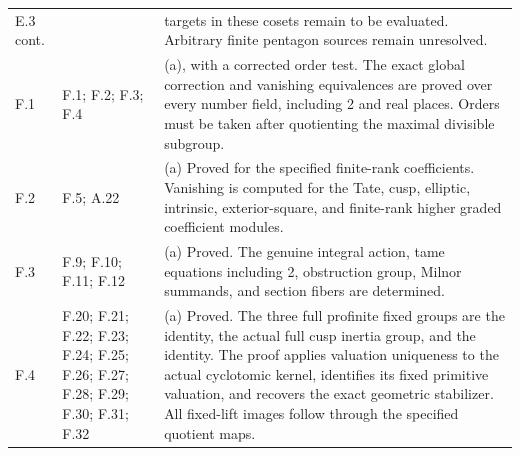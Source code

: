 \begin{longtable}{@{}p{1.1cm}p{3.0cm}p{10.3cm}@{}}
E.3 cont. &  & targets in these cosets remain to be evaluated. Arbitrary finite pentagon sources remain unresolved. \\
F.1 & F.1; F.2; F.3; F.4 & (a), with a corrected order test. The exact global correction and vanishing equivalences are proved over every number field, including 2 and real places. Orders must be taken after quotienting the maximal divisible subgroup. \\
F.2 & F.5; A.22 & (a) Proved for the specified finite-rank coefficients. Vanishing is computed for the Tate, cusp, elliptic, intrinsic, exterior-square, and finite-rank higher graded coefficient modules. \\
F.3 & F.9; F.10; F.11; F.12 & (a) Proved. The genuine integral action, tame equations including 2, obstruction group, Milnor summands, and section fibers are determined. \\
F.4 & F.20; F.21; F.22; F.23; F.24; F.25; F.26; F.27; F.28; F.29; F.30; F.31; F.32 & (a) Proved. The three full profinite fixed groups are the identity, the actual full cusp inertia group, and the identity. The proof applies valuation uniqueness to the actual cyclotomic kernel, identifies its fixed primitive valuation, and recovers the exact geometric stabilizer. All fixed-lift images follow through the specified quotient maps. \\
\bottomrule\end{longtable}
